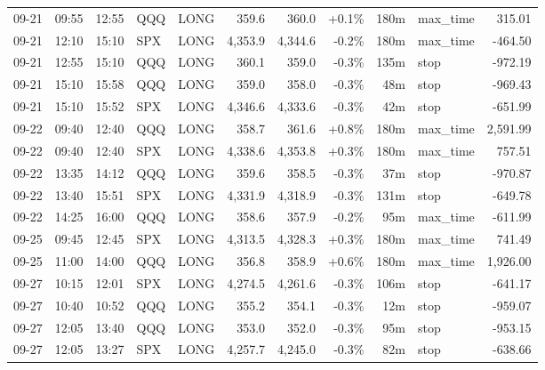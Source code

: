 \documentclass[11pt,a4paper,twoside]{article}
\begin{document}
\begin{center}
\begin{longtable}{>{\color{txtmain}}l l l l l r r r r >{\color{txtmain}}l r}
09-21 & 09:55 & 12:55 & QQQ & LONG & 359.6 & 360.0 & \textcolor{wingreen}{+0.1\%} & 180m & max\_time & \textcolor{wingreen}{315.01} \\
09-21 & 12:10 & 15:10 & SPX & LONG & 4,353.9 & 4,344.6 & \textcolor{lossred}{-0.2\%} & 180m & max\_time & \textcolor{lossred}{-464.50} \\
09-21 & 12:55 & 15:10 & QQQ & LONG & 360.1 & 359.0 & \textcolor{lossred}{-0.3\%} & 135m & stop & \textcolor{lossred}{-972.19} \\
09-21 & 15:10 & 15:58 & QQQ & LONG & 359.0 & 358.0 & \textcolor{lossred}{-0.3\%} & 48m & stop & \textcolor{lossred}{-969.43} \\
09-21 & 15:10 & 15:52 & SPX & LONG & 4,346.6 & 4,333.6 & \textcolor{lossred}{-0.3\%} & 42m & stop & \textcolor{lossred}{-651.99} \\
09-22 & 09:40 & 12:40 & QQQ & LONG & 358.7 & 361.6 & \textcolor{wingreen}{+0.8\%} & 180m & max\_time & \textcolor{wingreen}{2,591.99} \\
09-22 & 09:40 & 12:40 & SPX & LONG & 4,338.6 & 4,353.8 & \textcolor{wingreen}{+0.3\%} & 180m & max\_time & \textcolor{wingreen}{757.51} \\
09-22 & 13:35 & 14:12 & QQQ & LONG & 359.6 & 358.5 & \textcolor{lossred}{-0.3\%} & 37m & stop & \textcolor{lossred}{-970.87} \\
09-22 & 13:40 & 15:51 & SPX & LONG & 4,331.9 & 4,318.9 & \textcolor{lossred}{-0.3\%} & 131m & stop & \textcolor{lossred}{-649.78} \\
09-22 & 14:25 & 16:00 & QQQ & LONG & 358.6 & 357.9 & \textcolor{lossred}{-0.2\%} & 95m & max\_time & \textcolor{lossred}{-611.99} \\
09-25 & 09:45 & 12:45 & SPX & LONG & 4,313.5 & 4,328.3 & \textcolor{wingreen}{+0.3\%} & 180m & max\_time & \textcolor{wingreen}{741.49} \\
09-25 & 11:00 & 14:00 & QQQ & LONG & 356.8 & 358.9 & \textcolor{wingreen}{+0.6\%} & 180m & max\_time & \textcolor{wingreen}{1,926.00} \\
09-27 & 10:15 & 12:01 & SPX & LONG & 4,274.5 & 4,261.6 & \textcolor{lossred}{-0.3\%} & 106m & stop & \textcolor{lossred}{-641.17} \\
09-27 & 10:40 & 10:52 & QQQ & LONG & 355.2 & 354.1 & \textcolor{lossred}{-0.3\%} & 12m & stop & \textcolor{lossred}{-959.07} \\
09-27 & 12:05 & 13:40 & QQQ & LONG & 353.0 & 352.0 & \textcolor{lossred}{-0.3\%} & 95m & stop & \textcolor{lossred}{-953.15} \\
09-27 & 12:05 & 13:27 & SPX & LONG & 4,257.7 & 4,245.0 & \textcolor{lossred}{-0.3\%} & 82m & stop & \textcolor{lossred}{-638.66} \\

\end{longtable}
\end{center}
\end{document}
